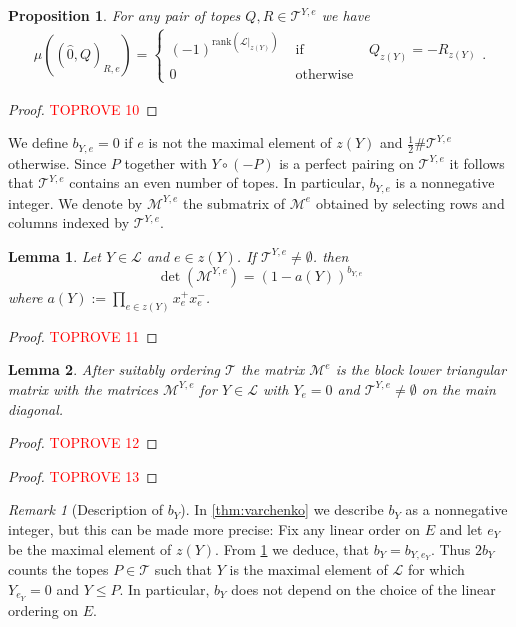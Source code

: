 \documentclass[12pt]{amsart}
\def\Tscr{{\mathcal T}}
\def\rank{{\mathrm{rank}}}
\theoremstyle{plain}
\newtheorem{Lemma}{Lemma}
\numberwithin{Lemma}{\DefaultNumberTheoremWithin}
\numberwithin{Claim}{\DefaultNumberTheoremWithin}
\numberwithin{Theorem}{\DefaultNumberTheoremWithin}
\numberwithin{Corollary}{\DefaultNumberTheoremWithin}
\newtheorem{Proposition}{Proposition}
\numberwithin{Proposition}{\DefaultNumberTheoremWithin}
\numberwithin{Conjecture}{\DefaultNumberTheoremWithin}
\numberwithin{Situation}{\DefaultNumberTheoremWithin}
\numberwithin{Note}{\DefaultNumberTheoremWithin}
\theoremstyle{definition}
\numberwithin{Definition}{\DefaultNumberTheoremWithin}
\theoremstyle{definition}
\numberwithin{Question}{\DefaultNumberTheoremWithin}
\theoremstyle{definition}
\numberwithin{Problem}{\DefaultNumberTheoremWithin}
\theoremstyle{remark} \newtheorem{Remark}{Remark}
\numberwithin{Remark}{\DefaultNumberTheoremWithin}
\theoremstyle{remark}
\numberwithin{Example}{\DefaultNumberTheoremWithin}
\numberwithin{Case}{Lemma}
\numberwithin{Step}{Lemma}
\begin{document}
\begin{Proposition}\label{pro:contraction}
  For any pair of topes  $Q,R \in \Tscr^{Y,e}$ we have 
  \begin{eqnarray*} 
     \mu((\hat{0},Q)_{R,e}) = 
       \left\{ \begin{array}{ccc} 
          (-1)^{\rank(\mathcal{L}|_{z(Y)})} & \mbox{~if~} & Q_{z(Y)} = -R_{z(Y)} \\ 
          0 & \mbox{~otherwise~} & 
  \end{array} \right. .  
  \end{eqnarray*} 
  
\end{Proposition}

\begin{proof}\textcolor{red}{TOPROVE 10}\end{proof}
We define $b_{Y,e} = 0$ if $e$ is not the maximal element of 
$z(Y)$ and $\frac{1}{2} \# \Tscr^{Y,e}$ otherwise. 
Since $P$ together with $Y \circ (-P)$ is a perfect pairing on 
$\Tscr^{Y,e}$ it follows that $\Tscr^{Y,e}$ contains an even number of
topes. In particular, $b_{Y,e}$ is a nonnegative integer. 
We denote by $\mathcal{M}^{Y,e}$ the submatrix of $\mathcal{M}^e$ obtained by selecting rows and columns indexed by $\Tscr^{Y,e}$.  

\begin{Lemma}
  \label{lem:formula}
  Let $Y \in \mathcal{L}$ and $e \in z(Y)$.
  If $\Tscr^{Y,e} \neq \emptyset$. 
  then 
  $$\det(\mathcal{M}^{Y,e}) = (1-a(Y))^{b_{Y,e}}$$
  where $a(Y) := \prod_{e \in z(Y)} x_{e}^+ x_{e}^-$.
\end{Lemma}
\begin{proof}\textcolor{red}{TOPROVE 11}\end{proof}

\begin{Lemma}
  \label{lem:block}
  After suitably ordering $\Tscr$ the matrix $\mathcal{M}^e$ is the block 
  lower triangular matrix
  with the matrices $\mathcal{M}^{Y,e}$ for $Y \in \mathcal{L}$ with $Y_e = 0$ and
  $\Tscr^{Y,e} \neq \emptyset$ on the main
  diagonal.
\end{Lemma}
\begin{proof}\textcolor{red}{TOPROVE 12}\end{proof}

\begin{proof}\textcolor{red}{TOPROVE 13}\end{proof}

\begin{Remark}[Description of $b_Y$]\label{note:bY}
In \ref{thm:varchenko} we describe $b_Y$ as a nonnegative integer, but this can be made more precise: Fix any linear order on $E$ and let $e_Y$ be the maximal element of $z(Y)$. From \ref{lem:formula} we deduce, that $b_Y = b_{Y,e_Y}$. Thus $2b_Y
$ counts the topes $P \in \Tscr$
such that $Y$ is the maximal element of $\mathcal{L}$ for which $Y_{e_Y} = 0$ and $Y \leq P$. In particular, $b_Y$ does not depend on the choice of the linear ordering on $E$.
\end{Remark}
\end{document}
